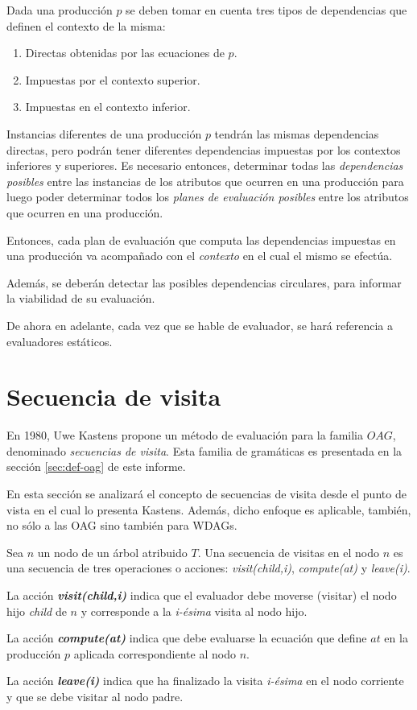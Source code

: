 Dada una producción $p$ se deben tomar en cuenta tres tipos de dependencias que definen el contexto de la misma:
\begin{enumerate}
\item Directas obtenidas por las ecuaciones de $p$.
\item Impuestas por el contexto superior.
\item Impuestas en el contexto inferior.
\end{enumerate}

Instancias diferentes de una producción $p$ tendrán las mismas dependencias directas, pero podrán tener diferentes dependencias impuestas por los contextos inferiores y superiores. Es necesario entonces, determinar todas las \emph{dependencias posibles} entre las instancias de los atributos que ocurren en una producción para luego poder determinar todos los \emph{planes de evaluación posibles} entre los atributos que ocurren en una producción.

Entonces, cada plan de evaluación que computa las dependencias impuestas en una producción va acompañado con el \textit{contexto} en el cual el mismo se efectúa.

Además, se deberán detectar las posibles dependencias circulares, para informar la viabilidad de su evaluación.

De ahora en adelante, cada vez que se hable de evaluador, se hará referencia a evaluadores estáticos.

\section{Secuencia de visita}
\label{sec:sec-visit}
En 1980, Uwe Kastens propone un método de evaluación para la familia $OAG$, denominado \emph{secuencias de visita}\cite{kastens}. Esta familia de gramáticas es presentada en la sección \ref{sec:def-oag} de este informe.

En esta sección se analizará el concepto de secuencias de visita desde el punto de vista en el cual lo presenta Kastens. Además, dicho enfoque es aplicable, también, no sólo a las OAG sino también para WDAGs.

Sea $n$ un nodo de un árbol atribuido $T$. 
Una secuencia de visitas en el nodo $n$ es una secuencia de tres operaciones o acciones: 
\emph{visit(child,i)}, \emph{compute(at)} y \emph{leave(i)}.

\begin{description}
\item La acción \emph{\textbf{visit(child,i)}} indica que el evaluador debe moverse (visitar) el nodo hijo \emph{child} de $n$ y corresponde a la \emph{i-ésima} visita al nodo hijo.

\item La acción \emph{\textbf{compute(at)}} indica que debe evaluarse la ecuación que define $at$ en la producción $p$ aplicada correspondiente al nodo $n$.

\item La acción \emph{\textbf{leave(i)}} indica que ha finalizado la visita \emph{i-ésima} en el nodo corriente y que se debe visitar al nodo padre.
\end{description}

